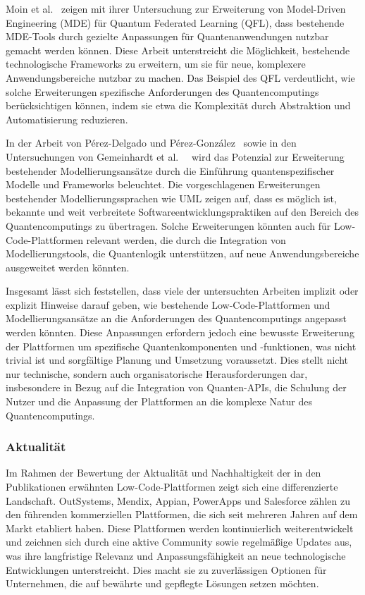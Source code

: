 Moin et al.~\cite{Moin_2023} zeigen mit ihrer Untersuchung zur Erweiterung von Model-Driven Engineering (MDE) für Quantum 
Federated Learning (QFL), dass bestehende MDE-Tools durch gezielte Anpassungen für Quantenanwendungen nutzbar gemacht 
werden können. Diese Arbeit unterstreicht die Möglichkeit, bestehende technologische Frameworks zu erweitern, um sie für neue, 
komplexere Anwendungsbereiche nutzbar zu machen. Das Beispiel des QFL verdeutlicht, wie solche Erweiterungen spezifische 
Anforderungen des Quantencomputings berücksichtigen können, indem sie etwa die Komplexität durch Abstraktion und Automatisierung reduzieren.

In der Arbeit von Pérez-Delgado und Pérez-González~\cite{Perez-Delgado_2020} sowie in den Untersuchungen von 
Gemeinhardt et al.~\cite{gemeinhardt2021towards}~\cite{Gemeinhardt_2018} wird das Potenzial zur Erweiterung bestehender 
Modellierungsansätze durch die Einführung quantenspezifischer Modelle und Frameworks beleuchtet. Die vorgeschlagenen 
Erweiterungen bestehender Modellierungssprachen wie UML zeigen auf, dass es möglich ist, bekannte und weit verbreitete 
Softwareentwicklungspraktiken auf den Bereich des Quantencomputings zu übertragen. Solche Erweiterungen könnten auch für 
Low-Code-Plattformen relevant werden, die durch die Integration von Modellierungstools, die Quantenlogik unterstützen, 
auf neue Anwendungsbereiche ausgeweitet werden könnten.

Insgesamt lässt sich feststellen, dass viele der untersuchten Arbeiten implizit oder explizit Hinweise darauf geben, wie bestehende 
Low-Code-Plattformen und Modellierungsansätze an die Anforderungen des Quantencomputings angepasst werden könnten. Diese Anpassungen 
erfordern jedoch eine bewusste Erweiterung der Plattformen um spezifische Quantenkomponenten und -funktionen, was nicht trivial 
ist und sorgfältige Planung und Umsetzung voraussetzt. Dies stellt nicht nur technische, sondern auch organisatorische Herausforderungen 
dar, insbesondere in Bezug auf die Integration von Quanten-APIs, die Schulung der Nutzer und die Anpassung der Plattformen 
an die komplexe Natur des Quantencomputings.

\subsubsection{Aktualität}
Im Rahmen der Bewertung der Aktualität und Nachhaltigkeit der in den Publikationen erwähnten Low-Code-Plattformen zeigt 
sich eine differenzierte Landschaft. OutSystems, Mendix, Appian, PowerApps und Salesforce zählen zu den führenden kommerziellen 
Plattformen, die sich seit mehreren Jahren auf dem Markt etabliert haben. Diese Plattformen werden kontinuierlich weiterentwickelt 
und zeichnen sich durch eine aktive Community sowie regelmäßige Updates aus, was ihre langfristige Relevanz und Anpassungsfähigkeit 
an neue technologische Entwicklungen unterstreicht. Dies macht sie zu zuverlässigen Optionen für Unternehmen, die auf bewährte 
und gepflegte Lösungen setzen möchten.

